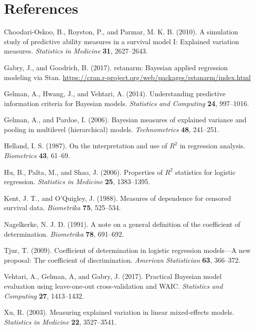 \documentclass[11pt]{article}
\begin{document}
\section*{References}

\noindent

\bibitem Choodari-Oskoo, B., Royston, P., and Parmar, M. K. B. (2010).  A simulation study of predictive ability measures in a survival model I: Explained variation measures.  {\em Statistics in Medicine} {\bf 31}, 2627--2643.

\bibitem Gabry, J., and Goodrich, B. (2017).  rstanarm:  Bayesian applied regression modeling via Stan.  \url{https://cran.r-project.org/web/packages/rstanarm/index.html}

\bibitem Gelman, A., Hwang, J., and Vehtari, A. (2014).  Understanding predictive information criteria for Bayesian models. {\em Statistics and Computing} {\bf 24}, 997--1016.

\bibitem Gelman, A., and Pardoe, I. (2006).  Bayesian measures of explained variance and pooling in multilevel (hierarchical) models. {\em Technometrics} {\bf 48}, 241--251.

\bibitem Helland, I. S. (1987).  On the interpretation and use of $R^2$ in regression analysis.  {\em Biometrics} {\bf 43}, 61--69.

\bibitem Hu, B., Palta, M., and Shao, J. (2006).  Properties of $R^2$ statistics for logistic regression.  {\em Statistics in Medicine} {\bf 25}, 1383--1395.

\bibitem Kent, J. T., and O'Quigley, J. (1988). Measures of dependence for censored survival data. {\em Biometrika} {\bf 75}, 525--534.

\bibitem Nagelkerke, N. J. D. (1991).  A note on a general definition of the coefficient of determination. {\em Biometrika} {\bf 78}, 691--692.

\bibitem Tjur, T. (2009).  Coefficient of determination in logistic regression models---A new proposal:  The coefficient of discrimination.  {\em American Statistician} {\bf 63}, 366--372.

\bibitem Vehtari, A., Gelman, A, and Gabry, J. (2017).  Practical Bayesian model evaluation using leave-one-out cross-validation and WAIC. {\em Statistics and Computing} {\bf 27}, 1413--1432.

\bibitem Xu, R. (2003).  Measuring explained variation in linear mixed-effects models.  {\em Statistics in Medicine} {\bf 22}, 3527--3541.

\pagebreak
\end{document}
